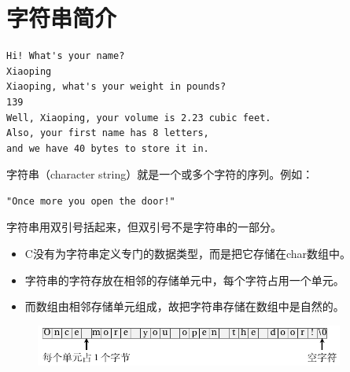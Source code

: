 \section{字符串简介}

\begin{frame} 

\end{frame}


\begin{frame}[fragile] \ft{\secname}
\begin{lstlisting}
Hi! What's your name?
Xiaoping
Xiaoping, what's your weight in pounds?
139
Well, Xiaoping, your volume is 2.23 cubic feet.
Also, your first name has 8 letters, 
and we have 40 bytes to store it in.
\end{lstlisting}
\end{frame}

\begin{frame}[fragile] \ft{\secname}
\begin{dingyi}
字符串（character string）就是一个或多个字符的序列。例如：
\begin{lstlisting}
"Once more you open the door!"
\end{lstlisting}

\end{dingyi}
\vspace{0.1in}

\begin{zhu}
字符串用双引号括起来，但双引号不是字符串的一部分。
\end{zhu}
\end{frame}

\begin{frame} \ft{\secname}
\begin{itemize}
\item
C没有为字符串定义专门的数据类型，而是把它存储在char数组中。
\\[0.2in]
\item
字符串的字符存放在相邻的存储单元中，每个字符占用一个单元。
\\[0.2in]
\item
而数组由相邻存储单元组成，故把字符串存储在数组中是自然的。
\end{itemize}
\end{frame}



\begin{frame}\ft{\secname}
\begin{figure}
\centering
\includegraphics[width=4in]{ch04/images/char_storage.pdf}
\end{figure}
\end{frame}

